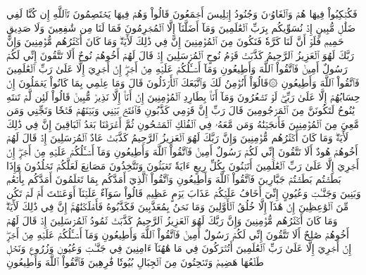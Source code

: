 فَكُبۡكِبُواْ فِيهَا هُمۡ وَٱلۡغَاوُۥنَ
وَجُنُودُ إِبۡلِيسَ أَجۡمَعُونَ
قَالُواْ وَهُمۡ فِيهَا يَخۡتَصِمُونَ
تَٱللَّهِ إِن كُنَّا لَفِي ضَلَٰلٖ مُّبِينٍ
إِذۡ نُسَوِّيكُم بِرَبِّ ٱلۡعَٰلَمِينَ
وَمَآ أَضَلَّنَآ إِلَّا ٱلۡمُجۡرِمُونَ
فَمَا لَنَا مِن شَٰفِعِينَ
وَلَا صَدِيقٍ حَمِيمٖ
فَلَوۡ أَنَّ لَنَا كَرَّةٗ فَنَكُونَ مِنَ ٱلۡمُؤۡمِنِينَ
إِنَّ فِي ذَٰلِكَ لَأٓيَةٗۖ وَمَا كَانَ أَكۡثَرُهُم مُّؤۡمِنِينَ
وَإِنَّ رَبَّكَ لَهُوَ ٱلۡعَزِيزُ ٱلرَّحِيمُ
كَذَّبَتۡ قَوۡمُ نُوحٍ ٱلۡمُرۡسَلِينَ
إِذۡ قَالَ لَهُمۡ أَخُوهُمۡ نُوحٌ أَلَا تَتَّقُونَ
إِنِّي لَكُمۡ رَسُولٌ أَمِينٞ
فَٱتَّقُواْ ٱللَّهَ وَأَطِيعُونِ
وَمَآ أَسۡـَٔلُكُمۡ عَلَيۡهِ مِنۡ أَجۡرٍۖ إِنۡ أَجۡرِيَ إِلَّا عَلَىٰ رَبِّ ٱلۡعَٰلَمِينَ
فَٱتَّقُواْ ٱللَّهَ وَأَطِيعُونِ
۞قَالُوٓاْ أَنُؤۡمِنُ لَكَ وَٱتَّبَعَكَ ٱلۡأَرۡذَلُونَ
قَالَ وَمَا عِلۡمِي بِمَا كَانُواْ يَعۡمَلُونَ
إِنۡ حِسَابُهُمۡ إِلَّا عَلَىٰ رَبِّيۖ لَوۡ تَشۡعُرُونَ
وَمَآ أَنَا۠ بِطَارِدِ ٱلۡمُؤۡمِنِينَ
إِنۡ أَنَا۠ إِلَّا نَذِيرٞ مُّبِينٞ
قَالُواْ لَئِن لَّمۡ تَنتَهِ يَٰنُوحُ لَتَكُونَنَّ مِنَ ٱلۡمَرۡجُومِينَ
قَالَ رَبِّ إِنَّ قَوۡمِي كَذَّبُونِ
فَٱفۡتَحۡ بَيۡنِي وَبَيۡنَهُمۡ فَتۡحٗا وَنَجِّنِي وَمَن مَّعِيَ مِنَ ٱلۡمُؤۡمِنِينَ
فَأَنجَيۡنَٰهُ وَمَن مَّعَهُۥ فِي ٱلۡفُلۡكِ ٱلۡمَشۡحُونِ
ثُمَّ أَغۡرَقۡنَا بَعۡدُ ٱلۡبَاقِينَ
إِنَّ فِي ذَٰلِكَ لَأٓيَةٗۖ وَمَا كَانَ أَكۡثَرُهُم مُّؤۡمِنِينَ
وَإِنَّ رَبَّكَ لَهُوَ ٱلۡعَزِيزُ ٱلرَّحِيمُ
كَذَّبَتۡ عَادٌ ٱلۡمُرۡسَلِينَ
إِذۡ قَالَ لَهُمۡ أَخُوهُمۡ هُودٌ أَلَا تَتَّقُونَ
إِنِّي لَكُمۡ رَسُولٌ أَمِينٞ
فَٱتَّقُواْ ٱللَّهَ وَأَطِيعُونِ
وَمَآ أَسۡـَٔلُكُمۡ عَلَيۡهِ مِنۡ أَجۡرٍۖ إِنۡ أَجۡرِيَ إِلَّا عَلَىٰ رَبِّ ٱلۡعَٰلَمِينَ
أَتَبۡنُونَ بِكُلِّ رِيعٍ ءَايَةٗ تَعۡبَثُونَ
وَتَتَّخِذُونَ مَصَانِعَ لَعَلَّكُمۡ تَخۡلُدُونَ
وَإِذَا بَطَشۡتُم بَطَشۡتُمۡ جَبَّارِينَ
فَٱتَّقُواْ ٱللَّهَ وَأَطِيعُونِ
وَٱتَّقُواْ ٱلَّذِيٓ أَمَدَّكُم بِمَا تَعۡلَمُونَ
أَمَدَّكُم بِأَنۡعَٰمٖ وَبَنِينَ
وَجَنَّـٰتٖ وَعُيُونٍ
إِنِّيٓ أَخَافُ عَلَيۡكُمۡ عَذَابَ يَوۡمٍ عَظِيمٖ
قَالُواْ سَوَآءٌ عَلَيۡنَآ أَوَعَظۡتَ أَمۡ لَمۡ تَكُن مِّنَ ٱلۡوَٰعِظِينَ
إِنۡ هَٰذَآ إِلَّا خُلُقُ ٱلۡأَوَّلِينَ
وَمَا نَحۡنُ بِمُعَذَّبِينَ
فَكَذَّبُوهُ فَأَهۡلَكۡنَٰهُمۡۚ إِنَّ فِي ذَٰلِكَ لَأٓيَةٗۖ وَمَا كَانَ أَكۡثَرُهُم مُّؤۡمِنِينَ
وَإِنَّ رَبَّكَ لَهُوَ ٱلۡعَزِيزُ ٱلرَّحِيمُ
كَذَّبَتۡ ثَمُودُ ٱلۡمُرۡسَلِينَ
إِذۡ قَالَ لَهُمۡ أَخُوهُمۡ صَٰلِحٌ أَلَا تَتَّقُونَ
إِنِّي لَكُمۡ رَسُولٌ أَمِينٞ
فَٱتَّقُواْ ٱللَّهَ وَأَطِيعُونِ
وَمَآ أَسۡـَٔلُكُمۡ عَلَيۡهِ مِنۡ أَجۡرٍۖ إِنۡ أَجۡرِيَ إِلَّا عَلَىٰ رَبِّ ٱلۡعَٰلَمِينَ
أَتُتۡرَكُونَ فِي مَا هَٰهُنَآ ءَامِنِينَ
فِي جَنَّـٰتٖ وَعُيُونٖ
وَزُرُوعٖ وَنَخۡلٖ طَلۡعُهَا هَضِيمٞ
وَتَنۡحِتُونَ مِنَ ٱلۡجِبَالِ بُيُوتٗا فَٰرِهِينَ
فَٱتَّقُواْ ٱللَّهَ وَأَطِيعُونِ
